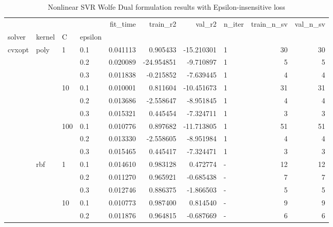 \begin{table}[h!]
\centering
\caption{Nonlinear SVR Wolfe Dual formulation results with Epsilon-insensitive loss}
\label{nonlinear_dual_svr_cv_results}
\begin{tabular}{llllrrrlrr}
\toprule
       &     &     &     &     fit\_time &   train\_r2 &     val\_r2 &    n\_iter &  train\_n\_sv &  val\_n\_sv \\
solver & kernel & C & epsilon &              &            &            &           &             &           \\
\midrule
cvxopt & poly & 1   & 0.1 &     0.041113 &   0.905433 & -15.210301 &         1 &          30 &        30 \\
       &     &     & 0.2 &     0.020089 & -24.954851 &  -9.710897 &         1 &           5 &         5 \\
       &     &     & 0.3 &     0.011838 &  -0.215852 &  -7.639445 &         1 &           4 &         4 \\
       &     & 10  & 0.1 &     0.010001 &   0.811604 & -10.451673 &         1 &          31 &        31 \\
       &     &     & 0.2 &     0.013686 &  -2.558647 &  -8.951845 &         1 &           4 &         4 \\
       &     &     & 0.3 &     0.015321 &   0.445454 &  -7.324711 &         1 &           3 &         3 \\
       &     & 100 & 0.1 &     0.010776 &   0.897682 & -11.713805 &         1 &          51 &        51 \\
       &     &     & 0.2 &     0.013330 &  -2.558605 &  -8.951984 &         1 &           4 &         4 \\
       &     &     & 0.3 &     0.015465 &   0.445417 &  -7.324471 &         1 &           3 &         3 \\
       & rbf & 1   & 0.1 &     0.014610 &   0.983128 &   0.472774 &         - &          12 &        12 \\
       &     &     & 0.2 &     0.011270 &   0.965921 &  -0.685438 &         - &           7 &         7 \\
       &     &     & 0.3 &     0.012746 &   0.886375 &  -1.866503 &         - &           5 &         5 \\
       &     & 10  & 0.1 &     0.010773 &   0.987400 &   0.814540 &         - &           9 &         9 \\
       &     &     & 0.2 &     0.011876 &   0.964815 &  -0.687669 &         - &           6 &         6 \\

\end{tabular}
\end{table}
